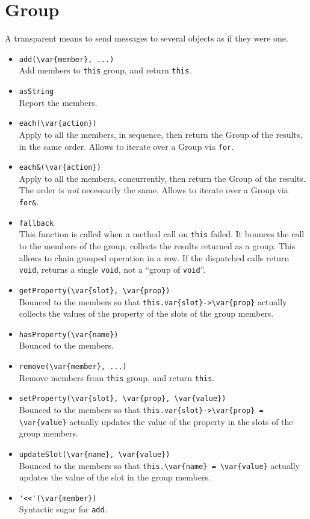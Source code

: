 \section{Group}
A transparent means to send messages to several objects as if they
were one.

\begin{itemize}
\item \lstinline|add(\var{member}, ...)|\\
  Add members to \lstinline|this| group, and return \lstinline|this|.
\item \lstinline|asString|\\
  Report the members.
\item \lstinline|each(\var{action})|\\
  Apply  to all the members, in sequence, then return the
  Group of the results, in the same order.  Allows to iterate over a
  Group via \lstinline|for|.
\item \lstinline|each&(\var{action})|\\
  Apply  to all the members, concurrently, then return the
  Group of the results.  The order is \emph{not} necessarily the same.
  Allows to iterate over a Group via \lstinline|for&|.
\item \lstinline|fallback|\\
  This function is called when a method call on \lstinline|this|
  failed.  It bounces the call to the members of the group, collects
  the results returned as a group.  This allows to chain grouped
  operation in a row.  If the dispatched calls return
  \lstinline|void|, returns a single \lstinline|void|, not a ``group
  of \lstinline|void|''.
\item \lstinline|getProperty(\var{slot}, \var{prop})|\\
  Bounced to the members so that
  \lstinline|this.var{slot}->\var{prop}| actually collects the values
  of the property  of the slots  of the group
  members.
\item \lstinline|hasProperty(\var{name})|\\
  Bounced to the members.
\item \lstinline|remove(\var{member}, ...)|\\
  Remove members from \lstinline|this| group, and return
  \lstinline|this|.
\item \lstinline|setProperty(\var{slot}, \var{prop}, \var{value})|\\
  Bounced to the members so that
  \lstinline|this.var{slot}->\var{prop} = \var{value}|
  actually updates the value of the property 
  in the slots  of the group members.
\item \lstinline|updateSlot(\var{name}, \var{value})|\\
  Bounced to the members so that
  \lstinline|this.\var{name} = \var{value}|
  actually updates the value of the slot  in
  the group members.
\item \lstinline|'<<'(\var{member})|\\
  Syntactic sugar for \lstinline|add|.
\end{itemize}

